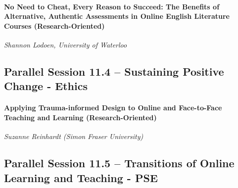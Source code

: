 \documentclass[
]{book}
\begin{document}
\begin{secondary}
\hypertarget{no-need-to-cheat-every-reason-to-succeed-the-benefits-of-alternative-authentic-assessments-in-online-english-literature-courses-research-oriented}{%
\paragraph{No Need to Cheat, Every Reason to Succeed: The Benefits of
Alternative, Authentic Assessments in Online English Literature Courses
(Research-Oriented)}\label{no-need-to-cheat-every-reason-to-succeed-the-benefits-of-alternative-authentic-assessments-in-online-english-literature-courses-research-oriented}}

\emph{Shannon Lodoen, University of Waterloo}
\end{secondary}

\hypertarget{parallel-session-11.4-sustaining-positive-change---ethics}{%
\subsection*{Parallel Session 11.4 -- Sustaining Positive Change - Ethics}\label{parallel-session-11.4-sustaining-positive-change---ethics}}

\begin{secondary}
\hypertarget{applying-trauma-informed-design-to-online-and-face-to-face-teaching-and-learning-research-oriented}{%
\paragraph{Applying Trauma-informed Design to Online and Face-to-Face
Teaching and Learning
(Research-Oriented)}\label{applying-trauma-informed-design-to-online-and-face-to-face-teaching-and-learning-research-oriented}}

\emph{Suzanne Reinhardt (Simon Fraser University)}
\end{secondary}

\hypertarget{parallel-session-11.5-transitions-of-online-learning-and-teaching---pse}{%
\subsection*{Parallel Session 11.5 -- Transitions of Online Learning and Teaching - PSE}\label{parallel-session-11.5-transitions-of-online-learning-and-teaching---pse}}
\end{document}
